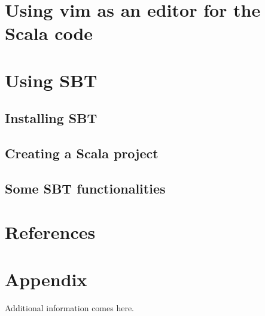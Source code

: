 \documentclass{article}
\begin{document}
\section{Using vim as an editor for the Scala code}
\section{Using SBT}
\subsection{Installing SBT}
\subsection{Creating a Scala project}
\subsection{Some SBT functionalities}
\section{References}

%
%
\printbibliography
\section{Appendix}
\begin{appendix}

Additional information comes here.
\listoffigures
\listoftables

\end{appendix}

  
\end{document}
